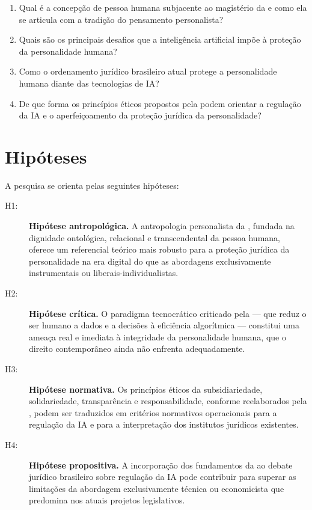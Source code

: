 \begin{enumerate}
    \item Qual é a concepção de pessoa humana subjacente ao magistério da \MH{} e como ela se articula com a tradição do pensamento personalista?
    \item Quais são os principais desafios que a inteligência artificial impõe à proteção da personalidade humana?
    \item Como o ordenamento jurídico brasileiro atual protege a personalidade humana diante das tecnologias de IA?
    \item De que forma os princípios éticos propostos pela \MH{} podem orientar a regulação da IA e o aperfeiçoamento da proteção jurídica da personalidade?
\end{enumerate}

\section{Hipóteses}
\label{sec:hipoteses}

A pesquisa se orienta pelas seguintes hipóteses:

\begin{description}
    \item[H1:] \textbf{Hipótese antropológica.} A antropologia personalista da \MH{}, fundada na dignidade ontológica, relacional e transcendental da pessoa humana, oferece um referencial teórico mais robusto para a proteção jurídica da personalidade na era digital do que as abordagens exclusivamente instrumentais ou liberais-individualistas.

    \item[H2:] \textbf{Hipótese crítica.} O paradigma tecnocrático criticado pela \MH{} --- que reduz o ser humano a dados e a decisões à eficiência algorítmica --- constitui uma ameaça real e imediata à integridade da personalidade humana, que o direito contemporâneo ainda não enfrenta adequadamente.

    \item[H3:] \textbf{Hipótese normativa.} Os princípios éticos da subsidiariedade, solidariedade, transparência e responsabilidade, conforme reelaborados pela \MH{}, podem ser traduzidos em critérios normativos operacionais para a regulação da IA e para a interpretação dos institutos jurídicos existentes.

    \item[H4:] \textbf{Hipótese propositiva.} A incorporação dos fundamentos da \MH{} ao debate jurídico brasileiro sobre regulação da IA pode contribuir para superar as limitações da abordagem exclusivamente técnica ou economicista que predomina nos atuais projetos legislativos.
\end{description}

